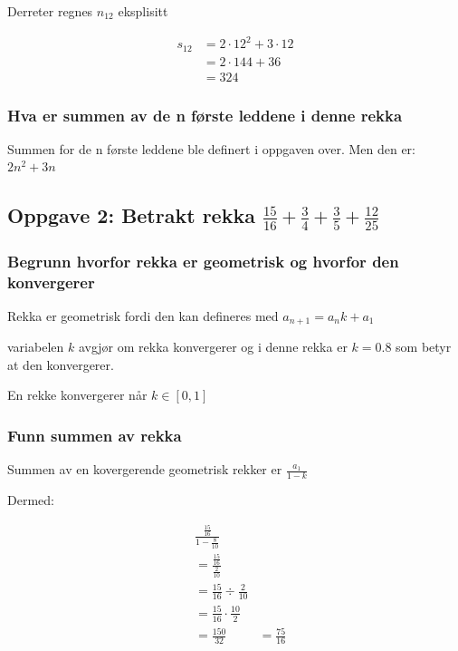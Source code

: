 \documentclass{article}
\begin{document}
Derreter regnes $n_{12}$ eksplisitt

\begin{align*}
    s_{12} &= 2 \cdot 12^2 + 3 \cdot 12 \\
    &= 2 \cdot 144 + 36 \\
    &= 324
\end{align*}

\subsubsection{Hva er summen av de n første leddene i denne rekka}

Summen for de n første leddene ble definert i oppgaven over. Men den er: $2n^2 + 3n$

\subsection{Oppgave 2: Betrakt rekka $\frac{15}{16} + \frac{3}{4} + \frac{3}{5} + \frac{12}{25}$}

\subsubsection{Begrunn hvorfor rekka er geometrisk og hvorfor den konvergerer}

Rekka er geometrisk fordi den kan defineres med $a_{n+1}=a_n k + a_1$

variabelen $k$ avgjør om rekka konvergerer og i denne rekka er $k=0.8$ som betyr at den konvergerer.

En rekke konvergerer når $k \in [0, 1]$

\subsubsection{Funn summen av rekka}

Summen av en kovergerende geometrisk rekker er $\frac{a_1}{1-k}$

Dermed:

\begin{align*}
    & \frac{\frac{15}{16}}{1-\frac{8}{10}} \\
    &= \frac{\frac{15}{16}}{\frac{2}{10}} \\ 
    &= \frac{15}{16} \div \frac{2}{10} \\
    &= \frac{15}{16} \cdot \frac{10}{2} \\
    &= \frac{150}{32}
    &= \frac{75}{16}
\end{align*}
\end{document}
